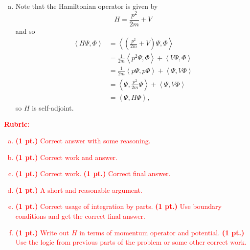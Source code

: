 \documentclass[12pt]{article} %
\newcommand{\innprod}[2]{\left\langle #1, #2\right\rangle}
\begin{document}
\begin{solution}
\begin{enumerate}[(a)]
\item Note that the Hamiltonian operator is given by
\[
H=\frac{p^2}{2m} + V
\]
and so
\begin{align*}
	\innprod{H \Psi}{\Phi} &= \innprod{\left(\frac{p^2}{2m} + V\right) \Psi}{\Phi}\\
	&= \frac{1}{2m}\innprod{p^2 \Psi}{\Phi} + \innprod{ V \Psi}{\Phi}\\
	&= \frac{1}{2m}\innprod{p\Psi}{p\Phi} + \innprod{\Psi}{V \Phi}\\
	&= \innprod{\Psi}{\frac{p^2}{2m} \Phi} + \innprod{\Psi}{V \Phi}\\
	&= \innprod{\Psi}{H \Phi},
\end{align*}
so $H$ is self-adjoint.
	\end{enumerate}
\end{solution}
\vspace*{1cm}
\textcolor{red}{
\noindent \textbf{Rubric:}
\begin{enumerate}[(a)]
    \item \textbf{(1 pt.)} Correct answer with some reasoning.
    \item \textbf{(1 pt.)} Correct work and answer.
    \item \textbf{(1 pt.)} Correct work. \textbf{(1 pt.)} Correct final answer.
	\item \textbf{(1 pt.)} A short and reasonable argument.
	\item \textbf{(1 pt.)} Correct usage of integration by parts. \textbf{(1 pt.)} Use boundary conditions and get the correct final answer.
	\item \textbf{(1 pt.)} Write out $H$ in terms of momentum operator and potential. \textbf{(1 pt.)} Use the logic from previous parts of the problem or some other correct work.
\end{enumerate}
}
\end{document}
